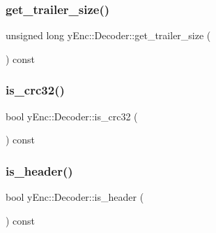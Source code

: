 \hypertarget{classy_enc_1_1_decoder_a93df0351daec3237ebfa4cdf0acf3904}{}\label{classy_enc_1_1_decoder_a93df0351daec3237ebfa4cdf0acf3904} 
\subsubsection{\texorpdfstring{get\+\_\+trailer\+\_\+size()}{get\_trailer\_size()}}
{\footnotesize\ttfamily unsigned long y\+Enc\+::\+Decoder\+::get\+\_\+trailer\+\_\+size (\begin{DoxyParamCaption}{ }\end{DoxyParamCaption}) const\hspace{0.3cm}{\ttfamily [inline]}}

\hypertarget{classy_enc_1_1_decoder_a0f44bd59e8e57492738ba81acc9af968}{}\label{classy_enc_1_1_decoder_a0f44bd59e8e57492738ba81acc9af968} 
\subsubsection{\texorpdfstring{is\+\_\+crc32()}{is\_crc32()}}
{\footnotesize\ttfamily bool y\+Enc\+::\+Decoder\+::is\+\_\+crc32 (\begin{DoxyParamCaption}{ }\end{DoxyParamCaption}) const\hspace{0.3cm}{\ttfamily [inline]}}

\hypertarget{classy_enc_1_1_decoder_a8dd093f0dbdaaaa216d8418ab35220e2}{}\label{classy_enc_1_1_decoder_a8dd093f0dbdaaaa216d8418ab35220e2} 
\subsubsection{\texorpdfstring{is\+\_\+header()}{is\_header()}}
{\footnotesize\ttfamily bool y\+Enc\+::\+Decoder\+::is\+\_\+header (\begin{DoxyParamCaption}{ }\end{DoxyParamCaption}) const\hspace{0.3cm}{\ttfamily [inline]}}

